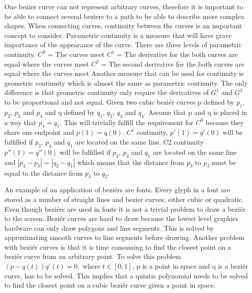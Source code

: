 One bezier curve can not represent arbitrary curves, therefore it is important to be able to connect several beziers to a path to be able to describe more complex shapes. When connecting curves, continuity between the curves is an important concept to consider. Parametric continuity is a measure that will have grave importance of the appearance of the curve. There are three levels of parametric continuity.\vspace{\baselineskip}\newline
\begin{math}C^0\end{math} = The curves meet\newline
\begin{math}C^1\end{math} = The derivative for the both curves are equal where the curves meet\newline
\begin{math}C^2\end{math} = The second derivative for the both curves are equal where the curves meet\vspace{\baselineskip} \newline
Another measure that can be used for continuity is geometric continuity which is almost the same as parametric continuity. The only difference is that geometric continuity only require the derivatives of $G^1$ and $G^2$ to be proportional and not equal. Given two cubic beziér curves p defined by $p_1$, $p_2$, $p_3$ and $p_4$ and q defined by $q_1$, $q_2$, $q_3$ and $q_4$. Assume that p and q is placed in a way that $p_4=q_1$. This will trivially fulfill the requirement for $C^0$ because they share one endpoint and $p(1)=q(0)$. $C^1$ continuity, $p'(1)=q'(0)$ will be fulfilled if $p_3$, $p_4$ and $q_1$ are located on the same line. C2 continuity $p''(1)=q''(0)$ will be fulfilled if  $p_3$, $p_4$ and $q_1$ are located on the same line and $|p_4 - p_3| = |q_2 - q_1|$ which means that the distance from $p_3$ to $p_4$ must be equal to the distance from $p_4$ to $q_2$.\citep{PFNP}

An example of an application of beziérs are fonts. Every glyph in a font are stored as a number of straight lines and bezier curves, either cubic or quadratic.\citep{phinney2001} Even though beziérs are used in fonts it is not a trivial problem to draw a beziér to the screen. Beziér curves are hard to draw because the lowest level graphics hardware can only draw polygons and line segments. This is solved by approximating smooth curves to line segments before drawing\citep{shreiner2009opengl}. Another problem with beziér curves is that it is time consuming to find the closest point on a beziér curve from an arbitrary point. To solve this problem $(p-q(t))q'(t)=0,$ where $t\in[0, 1] $, p is a point in space and q is a beziér curve, has to be solved\citep{xiaodiao}. This implies that a quintic polynomial needs to be solved to find the closest point on a cubic beziér curve given a point in space. 

